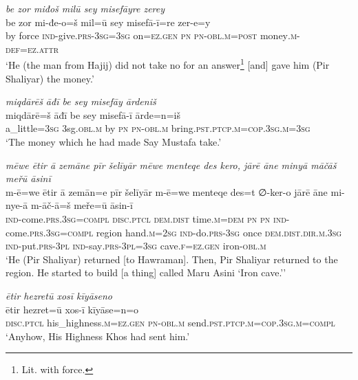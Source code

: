 \ea \label{ŽP.107}
\textit{be zor miđoš milū sey misefāyre zerey} \\ 
\gll be zor mi-đe-o=š mil=ū sey misefā-ī=re zer-e=y \\ 
 by force \textsc{ind-}give\textsc{.prs}\textsc{-3sg}\textsc{=3sg} on\textsc{\textsc{=ez.gen}} \textsc{pn} \textsc{pn}\textsc{-obl}\textsc{.m}\textsc{=\textsc{post}} money\textsc{.m}\textsc{-def}\textsc{=ez}.\textsc{attr} \\ 
\glt `He (the man from Hajij) did not take no for an answer\footnote{Lit. with force.} [and] gave him (Pir Shaliyar) the money.'
\z 
 
\ea \label{ŽP.113}
\textit{miqdārēš āđī be sey misefāy ārdeniš} \\ 
\gll miqdārē=š āđī be sey misefā-ī ārde=n=iš \\ 
 a\_little\textsc{=3sg} 3sg\textsc{.obl}\textsc{.m} by \textsc{pn} \textsc{pn}\textsc{-obl}\textsc{.m} bring\textsc{.pst}\textsc{.ptcp}\textsc{.m}\textsc{=cop}\textsc{.3sg}\textsc{.m}\textsc{=3sg} \\ 
\glt `The money which he had made Say Mustafa take.'
\z 
 
\ea \label{ŽP.116}
\textit{mēwe ētir ā zemāne pīr šelīyār mēwe menteqe des kero, jārē āne minyā māčāš meřū āsinī} \\ 
\gll m-ē=we ētir ā zemān=e pīr šelīyār m-ē=we menteqe des=t ∅-ker-o jārē āne mi-nye-ā m-āč-ā=š meře=ū āsin-ī \\ 
 \textsc{ind-}come\textsc{.prs}\textsc{.3sg}\textsc{=compl} \textsc{disc.ptcl} \textsc{dem.dist} time\textsc{.m}\textsc{=dem} \textsc{pn} \textsc{pn} \textsc{ind-}come\textsc{.prs}\textsc{.3sg}\textsc{=compl} region hand\textsc{.m}\textsc{=\textsc{2sg}} \textsc{ind-}do\textsc{.prs}\textsc{-3sg} once \textsc{dem.dist}\textsc{.dir}\textsc{.m}\textsc{.3sg} \textsc{ind-}put\textsc{.prs}\textsc{-3pl} \textsc{ind-}say\textsc{.prs}\textsc{-3pl}\textsc{=3sg} cave\textsc{.f}\textsc{\textsc{=ez.gen}} iron\textsc{-obl}\textsc{.m} \\ 
\glt `He (Pir Shaliyar) returned [to Hawraman]. Then, Pir Shaliyar returned to the region. He started to build [a thing] called Maru Asini ‘Iron cave.’'
\z 
 
\ea \label{ŽP.117}
\textit{ētir hezretū xosī kīyāseno} \\ 
\gll ētir hezret=ū xos-ī kīyāse=n=o \\ 
 \textsc{disc.ptcl} his\_highness\textsc{.m}\textsc{\textsc{=ez.gen}} \textsc{pn}\textsc{-obl}\textsc{.m} send\textsc{.pst}\textsc{.ptcp}\textsc{.m}\textsc{=cop}\textsc{.3sg}\textsc{.m}\textsc{=compl} \\ 
\glt `Anyhow, His Highness Khos had sent him.'
\z 
 
